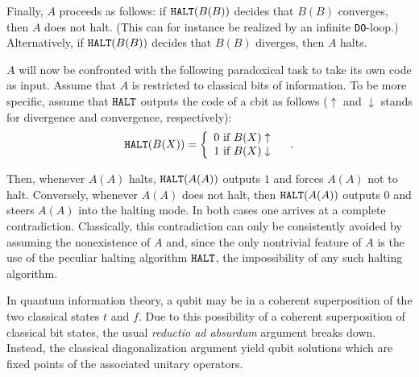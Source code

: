 \documentclass[prl,preprint,showpacs,showkeys,amsfonts,amsmath]{revtex4}
\begin{document}
Finally, $A$ proceeds as follows:  if ${\tt HALT}(B(B))$ decides that
$B(B)$ converges, then $A$ does not halt.
(This can for instance be realized by an infinite {\tt DO}-loop.)
Alternatively, if ${\tt HALT}(B(B))$ decides
that $B(B)$ diverges, then $A$ halts.

$A$ will now be confronted with the following paradoxical
task to take its own code as input.
 Assume that $A$ is
restricted to classical bits of information.
To be more specific,
assume that ${\tt HALT}$ outputs the code of a cbit as follows
($\uparrow$ and $\downarrow$ stands for divergence and convergence,
respectively):
\begin{equation}
{\tt HALT} ( B(X) ) =\left\{
 \begin{array}{l}
0 \mbox{ if } B(X) \uparrow
\\
1 \mbox{ if } B(X) \downarrow \\
\end{array}
 \right.
\quad .
\label{el:halt}
\end{equation}


Then, whenever $A(A)$
halts, ${\tt HALT}(A(A))$ outputs $1$ and forces $A(A)$ not to halt.
Conversely,
whenever $A(A)$ does not halt, then ${\tt HALT}(A(A))$ outputs $0$
and steers
$A(A)$ into the halting mode.  In both cases one arrives at a complete
contradiction.  Classically, this contradiction can only be consistently
avoided by assuming the nonexistence of $A$ and, since the only
nontrivial feature of $A$ is the use of the peculiar halting algorithm
${\tt HALT}$, the impossibility of any such halting algorithm.


In quantum information theory,
a qubit may be in a coherent
superposition
of the two classical states $t$ and $f$.
Due to this possibility of a coherent superposition of classical bit
states, the usual {\it reductio ad absurdum} argument breaks down.
Instead, the classical diagonalization argument yield qubit solutions which are fixed points
of the associated unitary operators.
\end{document}
